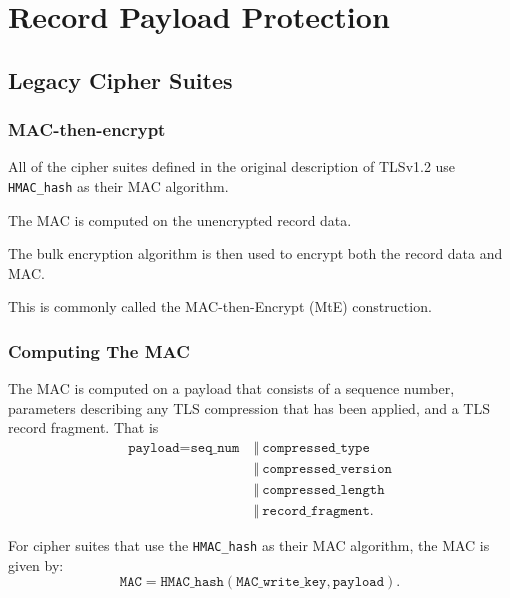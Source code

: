 \documentclass[aspectratio=169]{beamer}
\begin{document}
\section{Record Payload Protection}
\begin{frame}[Triangle=siiorange]
	\tocpage
\end{frame}

\subsection{Legacy Cipher Suites}
\begin{frame}[triangle=siiblue]
	\frametitle{MAC-then-encrypt}
	All of the cipher suites defined in the original description of TLSv1.2 use \texttt{HMAC\_hash} as their MAC algorithm.

	\vfill
	
	The MAC is computed on the unencrypted record data.
	
	\vfill
	
	The bulk encryption algorithm is then used to encrypt both the record data and MAC.
	
	\vfill
	
	This is commonly called the MAC-then-Encrypt (MtE) construction.
\end{frame}

\begin{frame}[triangle=siiblue]
	\frametitle{Computing The MAC}
	The MAC is computed on a payload that consists of a sequence number, parameters describing any TLS compression that has been applied, and a TLS record fragment. That is
	\begin{equation}\nonumber
	\begin{split}
		\texttt{payload} = \texttt{seq\_num} &\ \Vert \ \texttt{compressed\_type} \\
		&\ \Vert \ \texttt{compressed\_version} \\
		&\ \Vert \ \texttt{compressed\_length} \\
		&\ \Vert \ \texttt{record\_fragment}.
	\end{split}
	\end{equation}
	
	\vfill
	
	For cipher suites that use the \texttt{HMAC\_hash} as their MAC algorithm, the MAC is given by:
	\begin{equation}\nonumber
		\texttt{MAC} = \texttt{HMAC\_hash}\left(\texttt{MAC\_write\_key}, \texttt{payload}\right).
	\end{equation}
\end{frame}
\end{document}
